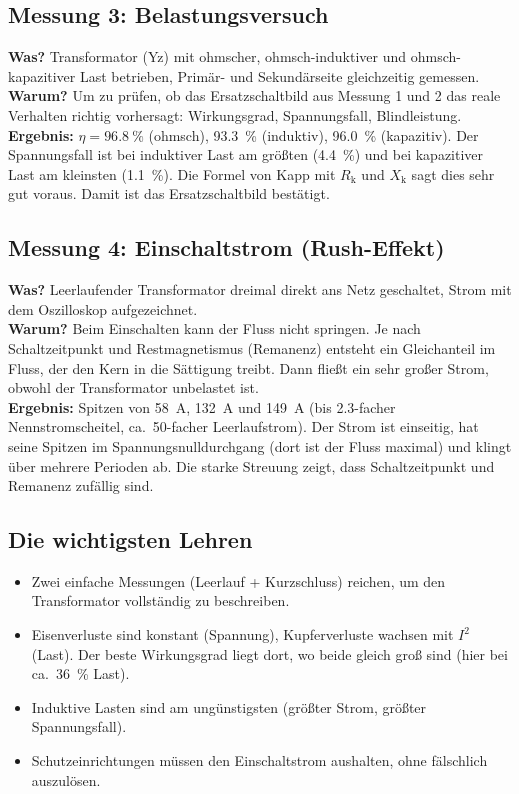 \documentclass[a4paper,11pt]{article}
\begin{document}
\subsection{Messung 3: Belastungsversuch}
\textbf{Was?} Transformator (Yz) mit ohmscher, ohmsch-induktiver und ohmsch-kapazitiver Last betrieben, Primär- und Sekundärseite gleichzeitig gemessen.\\
\textbf{Warum?} Um zu prüfen, ob das Ersatzschaltbild aus Messung 1 und 2 das reale Verhalten richtig vorhersagt: Wirkungsgrad, Spannungsfall, Blindleistung.\\
\textbf{Ergebnis:} $\eta = \SI{96,8}{\%}$ (ohmsch), \SI{93,3}{\%} (induktiv), \SI{96,0}{\%} (kapazitiv). Der Spannungsfall ist bei induktiver Last am größten (\SI{4,4}{\%}) und bei kapazitiver Last am kleinsten (\SI{1,1}{\%}). Die Formel von Kapp mit $R_\mathrm{k}$ und $X_\mathrm{k}$ sagt dies sehr gut voraus. Damit ist das Ersatzschaltbild bestätigt.

\subsection{Messung 4: Einschaltstrom (Rush-Effekt)}
\textbf{Was?} Leerlaufender Transformator dreimal direkt ans Netz geschaltet, Strom mit dem Oszilloskop aufgezeichnet.\\
\textbf{Warum?} Beim Einschalten kann der Fluss nicht springen. Je nach Schaltzeitpunkt und Restmagnetismus (Remanenz) entsteht ein Gleichanteil im Fluss, der den Kern in die Sättigung treibt. Dann fließt ein sehr großer Strom, obwohl der Transformator unbelastet ist.\\
\textbf{Ergebnis:} Spitzen von \SI{58}{A}, \SI{132}{A} und \SI{149}{A} (bis \SI{2,3}{}-facher Nennstromscheitel, ca.\ 50-facher Leerlaufstrom). Der Strom ist einseitig, hat seine Spitzen im Spannungsnulldurchgang (dort ist der Fluss maximal) und klingt über mehrere Perioden ab. Die starke Streuung zeigt, dass Schaltzeitpunkt und Remanenz zufällig sind.

\subsection{Die wichtigsten Lehren}
\begin{itemize}[nosep]
  \item Zwei einfache Messungen (Leerlauf + Kurzschluss) reichen, um den Transformator vollständig zu beschreiben.
  \item Eisenverluste sind konstant (Spannung), Kupferverluste wachsen mit $I^2$ (Last). Der beste Wirkungsgrad liegt dort, wo beide gleich groß sind (hier bei ca.\ \SI{36}{\%} Last).
  \item Induktive Lasten sind am ungünstigsten (größter Strom, größter Spannungsfall).
  \item Schutzeinrichtungen müssen den Einschaltstrom aushalten, ohne fälschlich auszulösen.
\end{itemize}
\end{document}
